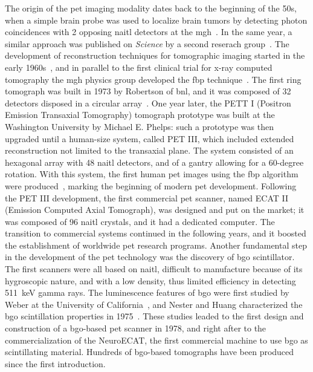 The origin of the \gls{pet} imaging modality dates back to the beginning of the 50s, when a simple brain probe was used to localize brain tumors by detecting photon coincidences with 2 opposing \gls{naitl} detectors at the \gls{mgh}~\parencite{Sweet1951}. In the same year, a similar approach was published on \textit{Science} by a second reserach group~\parencite{Wrenn1951}. The development of reconstruction techniques for tomographic imaging started in the early 1960s~\parencite{Kuhl1963}, and in parallel to the first clinical trial for x-ray computed tomography the \gls{mgh} physics group developed the \gls{fbp} technique~\parencite{Chesler1971}. The first ring tomograph was built in 1973 by Robertson of \gls{bnl}, and it was composed of 32 detectors disposed in a circular array~\parencite{Robertson1972}. One year later, the PETT I (Positron Emission Transaxial Tomography) tomograph prototype was built at the Washington University by Michael E. Phelps: such a prototype was then upgraded until a human-size system, called PET III, which included extended reconstruction not limited to the transaxial plane. The system consisted of an hexagonal array with 48 \gls{naitl} detectors, and of a gantry allowing for a 60-degree rotation. With this system, the first human \gls{pet} images using the \gls{fbp} algorithm were produced~\parencite{Hoffmann1976}, marking the beginning of modern \gls{pet} development. Following the PET III development, the first commercial \gls{pet} scanner, named ECAT II (Emission Computed Axial Tomograph), was designed and put on the market; it was composed of 96 \gls{naitl} crystals, and it had a dedicated computer. The transition to commercial systems continued in the following years, and it boosted the establishment of worldwide \gls{pet} research programs. Another fundamental step in the development of the \gls{pet} technology was the discovery of \gls{bgo} scintillator. The first scanners were all based on \gls{naitl}, difficult to manufacture because of its hygroscopic nature, and with a low density, thus limited efficiency in detecting 511~keV gamma rays.  The luminescence features of \gls{bgo} were first studied by Weber at the University of California~\parencite{Weber1973}, and Nester and Huang characterized the \gls{bgo} scintillation properties in 1975~\parencite{Nestor1975}. These studies leaded to the first design and construction of a \gls{bgo}-based \gls{pet} scanner in 1978, and right after to the commercialization of the NeuroECAT, the first commercial machine to use \gls{bgo} as scintillating material. Hundreds of \gls{bgo}-based tomographs have been produced since the first introduction. 
